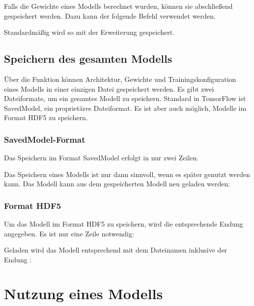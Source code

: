 Falls die Gewichte eines Modells berechnet wurden, können sie abschließend gespeichert werden. Dazu kann der folgende Befehl verwendet werden.

\medskip


\medskip

Standardmäßig wird so mit der Erweiterung  gespeichert.

\subsection{Speichern des gesamten Modells}

Über die Funktion  können Architektur, Gewichte und Trainingskonfiguration eines Modells in einer einzigen Datei gespeichert werden. Es gibt zwei Dateiformate, um ein gesamtes Modell zu speichern. Standard in TensorFlow  ist SavedModel, ein proprietäres Dateiformat. Es ist aber auch möglich, Modelle im Format HDF5 zu speichern.

\subsubsection{SavedModel-Format}

Das Speichern im Format SavedModel erfolgt in nur zwei Zeilen.

\medskip



\medskip

Das Speichern eines Modells ist nur dann sinnvoll, wenn es später genutzt werden kann.
Das Modell kann aus dem gespeicherten Modell neu geladen werden:

\medskip


\subsubsection{Format HDF5}

Um das Modell im Format HDF5 zu speichern, wird die entsprechende Endung  angegeben. Es ist nur eine Zeile notwendig:

\medskip


\medskip

Geladen wird das Modell entsprechend mit dem Dateinamen inklusive der Endung :

\medskip



\section{Nutzung eines Modells}


